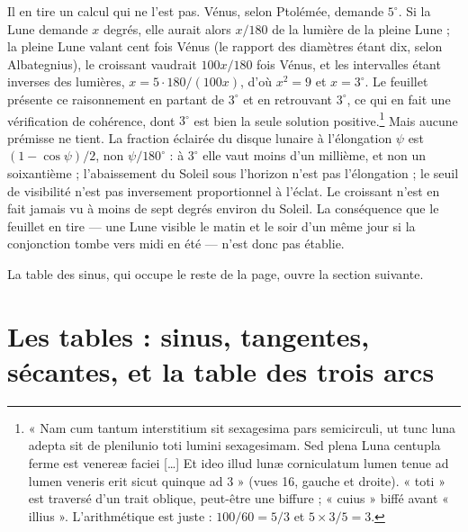 \documentclass[11pt,a4paper]{article}
\begin{document}
Il en tire un calcul qui ne l'est pas. Vénus, selon Ptolémée, demande
$5^\circ$. Si la Lune demande $x$ degrés, elle aurait alors $x/180$ de la
lumière de la pleine Lune ; la pleine Lune valant cent fois Vénus (le rapport
des diamètres étant dix, selon Albategnius), le croissant vaudrait
$100x/180$ fois Vénus, et les intervalles étant inverses des lumières,
$x = 5 \cdot 180/(100x)$, d'où $x^2 = 9$ et $x = 3^\circ$. Le feuillet présente
ce raisonnement en partant de $3^\circ$ et en retrouvant $3^\circ$, ce qui en fait
une vérification de cohérence, dont $3^\circ$ est bien la seule solution
positive.\footnote{« Nam cum tantum interstitium sit sexagesima pars semicirculi,
ut tunc luna adepta sit de plenilunio toti lumini sexagesimam. Sed plena Luna
centupla ferme est venereæ faciei […] Et ideo illud lunæ corniculatum lumen tenue
ad lumen veneris erit sicut quinque ad 3 » (vues 16, gauche et droite). « toti »
est traversé d'un trait oblique, peut-être une biffure ; « cuius » biffé avant
« illius ». L'arithmétique est juste : $100/60 = 5/3$ et
$5 \times 3/5 = 3$.} Mais aucune prémisse ne tient. La fraction éclairée du
disque lunaire à l'élongation $\psi$ est $(1-\cos\psi)/2$, non $\psi/180^\circ$ :
à $3^\circ$ elle vaut moins d'un millième, et non un soixantième ; l'abaissement du
Soleil sous l'horizon n'est pas l'élongation ; le seuil de visibilité n'est pas
inversement proportionnel à l'éclat. Le croissant n'est en fait jamais vu à
moins de sept degrés environ du Soleil. La conséquence que le feuillet en tire —
une Lune visible le matin et le soir d'un même jour si la conjonction tombe vers
midi en été — n'est donc pas établie.

La table des sinus, qui occupe le reste de la page, ouvre la section suivante.

\section*{Les tables : sinus, tangentes, sécantes, et la table des trois arcs}
\end{document}
